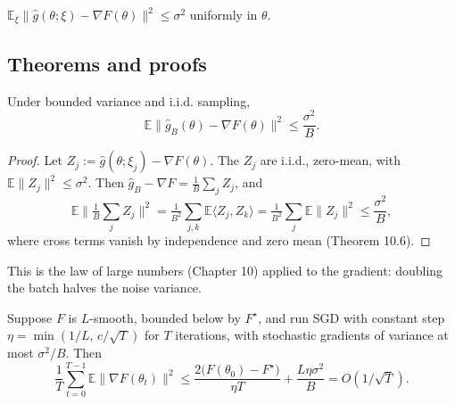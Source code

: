 \begin{definition}
$\mathbb{E}_\xi \|\hat g(\theta; \xi) - \nabla F(\theta)\|^2 \leq \sigma^2$ uniformly in $\theta$.
\end{definition}

\subsection*{Theorems and proofs}

\begin{theorem}
Under bounded variance and i.i.d. sampling,
\[
\mathbb{E}\|\hat g_B(\theta) - \nabla F(\theta)\|^2 \leq \frac{\sigma^2}{B}.
\]
\end{theorem}

\begin{proof}
Let $Z_j := \hat g(\theta; \xi_j) - \nabla F(\theta)$. The $Z_j$ are i.i.d., zero-mean, with $\mathbb{E}\|Z_j\|^2 \leq \sigma^2$. Then $\hat g_B - \nabla F = \tfrac{1}{B}\sum_j Z_j$, and
\[
\mathbb{E}\Big\|\tfrac{1}{B}\sum_j Z_j\Big\|^2 = \tfrac{1}{B^2}\sum_{j,k} \mathbb{E}\langle Z_j, Z_k\rangle = \tfrac{1}{B^2}\sum_j \mathbb{E}\|Z_j\|^2 \leq \frac{\sigma^2}{B},
\]
where cross terms vanish by independence and zero mean (Theorem 10.6).
\end{proof}

\begin{remark}
This is the law of large numbers (Chapter 10) applied to the gradient: doubling the batch halves the noise variance.
\end{remark}

\begin{theorem}
Suppose $F$ is $L$-smooth, bounded below by $F^\star$, and run SGD with constant step $\eta = \min(1/L,\, c/\sqrt{T})$ for $T$ iterations, with stochastic gradients of variance at most $\sigma^2/B$. Then
\[
\frac{1}{T}\sum_{t=0}^{T-1} \mathbb{E}\|\nabla F(\theta_t)\|^2 \leq \frac{2\big(F(\theta_0) - F^\star\big)}{\eta T} + \frac{L \eta \sigma^2}{B} = O(1/\sqrt{T}).
\]
\end{theorem}

